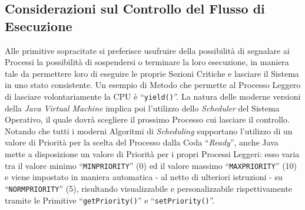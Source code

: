 \subsection{Considerazioni sul Controllo del Flusso di Esecuzione}
Alle primitive sopracitate si preferisce usufruire della possibilità di segnalare ai Processi la possibilità di sospendersi o terminare la loro esecuzione, in maniera tale da permettere loro di eseguire le proprie Sezioni Critiche e lasciare il Sistema in uno stato consistente. Un esempio di Metodo che permette al Processo Leggero di lasciare volontariamente la CPU è ``\texttt{yield()}''. La natura delle moderne versioni della \textit{Java Virtual Machine} implica poi l'utilizzo dello \textit{Scheduler} del Sistema Operativo, il quale dovrà scegliere il prossimo Processo cui lasciare il controllo. Notando che tutti i moderni Algoritmi di \textit{Scheduling} supportano l'utilizzo di un valore di Priorità per la scelta del Processo dalla Coda ``\textit{Ready}'', anche Java mette a disposizione un valore di Priorità per i propri Processi Leggeri: esso varia tra il valore minimo ``\texttt{MIN\textunderscore PRIORITY}'' (0) ed il valore massimo ``\texttt{MAX\textunderscore PRIORITY}'' (10) e viene impostato in maniera automatica - al netto di ulteriori istruzioni - su ``\texttt{NORM\textunderscore PRIORITY}'' (5), risultando visualizzabile e personalizzabile rispettivamente tramite le Primitive ``\texttt{getPriority()}'' e ``\texttt{setPriority()}''.